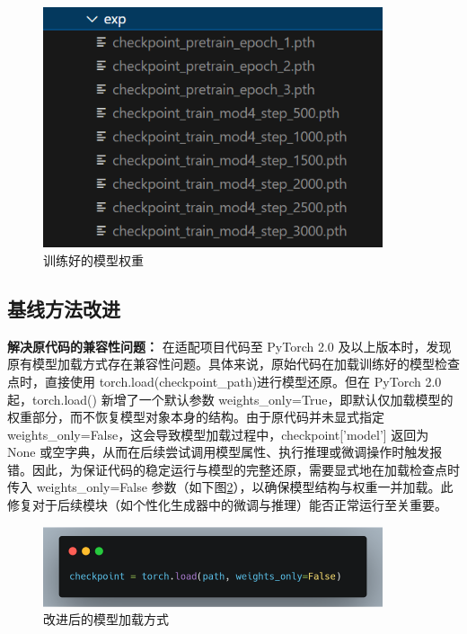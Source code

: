 \documentclass[10pt,a4paper]{article}
\begin{document}
\begin{figure}[H]
  \centering
  \includegraphics[width=10cm]{fig/model_weight.png}
  \caption{训练好的模型权重}\label{fig:model_weight}
\end{figure}

\subsection{基线方法改进}
\textbf{解决原代码的兼容性问题：}
在适配项目代码至 PyTorch 2.0 及以上版本时，发现原有模型加载方式存在兼容性问题。具体来说，原始代码在加载训练好的模型检查点时，直接使用 torch.load(checkpoint\_path)进行模型还原。但在 PyTorch 2.0 起，torch.load() 新增了一个默认参数 weights\_only=True，即默认仅加载模型的权重部分，而不恢复模型对象本身的结构。由于原代码并未显式指定 weights\_only=False，这会导致模型加载过程中，checkpoint['model'] 返回为 None 或空字典，从而在后续尝试调用模型属性、执行推理或微调操作时触发报错。因此，为保证代码的稳定运行与模型的完整还原，需要显式地在加载检查点时传入 weights\_only=False 参数（如下图\ref{fig:model_loader}），以确保模型结构与权重一并加载。此修复对于后续模块（如个性化生成器中的微调与推理）能否正常运行至关重要。

\begin{figure}[H]
  \centering
  \includegraphics[width=10cm]{fig/load_new.png}
  \caption{改进后的模型加载方式}\label{fig:model_loader}
\end{figure}
\end{document}
